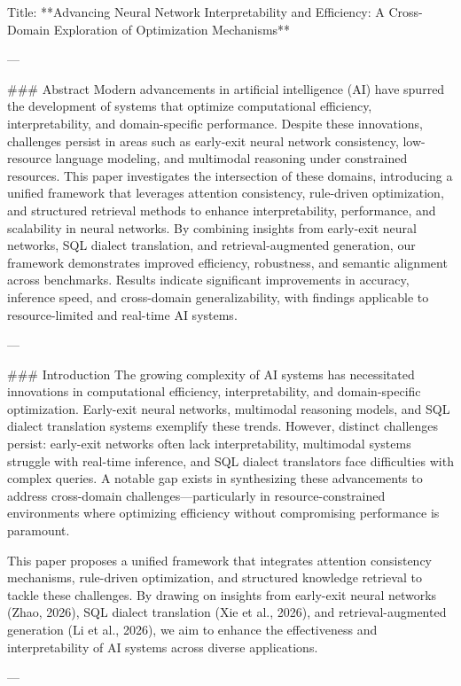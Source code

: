 Title: **Advancing Neural Network Interpretability and Efficiency: A Cross-Domain Exploration of Optimization Mechanisms**

---

### Abstract
Modern advancements in artificial intelligence (AI) have spurred the development of systems that optimize computational efficiency, interpretability, and domain-specific performance. Despite these innovations, challenges persist in areas such as early-exit neural network consistency, low-resource language modeling, and multimodal reasoning under constrained resources. This paper investigates the intersection of these domains, introducing a unified framework that leverages attention consistency, rule-driven optimization, and structured retrieval methods to enhance interpretability, performance, and scalability in neural networks. By combining insights from early-exit neural networks, SQL dialect translation, and retrieval-augmented generation, our framework demonstrates improved efficiency, robustness, and semantic alignment across benchmarks. Results indicate significant improvements in accuracy, inference speed, and cross-domain generalizability, with findings applicable to resource-limited and real-time AI systems.

---

### Introduction
The growing complexity of AI systems has necessitated innovations in computational efficiency, interpretability, and domain-specific optimization. Early-exit neural networks, multimodal reasoning models, and SQL dialect translation systems exemplify these trends. However, distinct challenges persist: early-exit networks often lack interpretability, multimodal systems struggle with real-time inference, and SQL dialect translators face difficulties with complex queries. A notable gap exists in synthesizing these advancements to address cross-domain challenges—particularly in resource-constrained environments where optimizing efficiency without compromising performance is paramount.

This paper proposes a unified framework that integrates attention consistency mechanisms, rule-driven optimization, and structured knowledge retrieval to tackle these challenges. By drawing on insights from early-exit neural networks (Zhao, 2026), SQL dialect translation (Xie et al., 2026), and retrieval-augmented generation (Li et al., 2026), we aim to enhance the effectiveness and interpretability of AI systems across diverse applications. 

---

